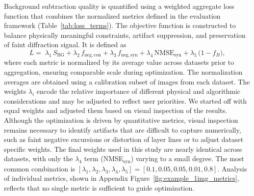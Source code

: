 \documentclass[iucr]{iucrjournals}
\begin{document}
Background subtraction quality is quantified using a weighted aggregate loss function that combines the normalized metrics defined in the evaluation framework (Table~\ref{tab:loss_terms}). The objective function is constructed to balance physically meaningful constraints, artifact suppression, and preservation of faint diffraction signal. It is defined as
\begin{equation}
L =\;
\lambda_1\, S_{\mathrm{BG}}
+ \lambda_2\, f_{\mathrm{neg,con}}
+ \lambda_3\, f_{\mathrm{neg,syn}}
+ \lambda_4\, \mathrm{NMSE}_{\mathrm{syn}}
+ \lambda_5\, \bigl(1 - f_{B}\bigr),
\end{equation}
where each metric is normalized by its average value across datasets prior to aggregation, ensuring comparable scale during optimization. The normalization averages are obtained using a calibration subset of images from each dataset. The weights $\lambda_i$ encode the relative importance of different physical and algorithmic considerations and may be adjusted to reflect user priorities. We started off with equal weights and adjusted them based on visual inspection of the results. Although the optimization is driven by quantitative metrics, visual inspection remains necessary to identify artifacts that are difficult to capture numerically, such as faint negative excursions or distortion of layer lines or to adjust dataset specific weights. The final weights used in this study are nearly identical across datasets, with only the $\lambda_4$ term (NMSE$_{\mathrm{syn}}$) varying to a small degree. The most common combination is $[\lambda_1, \lambda_2, \lambda_3, \lambda_4, \lambda_5] = [0.1, 0.05, 0.05, 0.01, 0.8]$. Analysis of individual metrics, shown in Appendix Figure~\ref{fig:example_1img_metrics}, reflects that no single metric is sufficient to guide optimization. 
\end{document}

